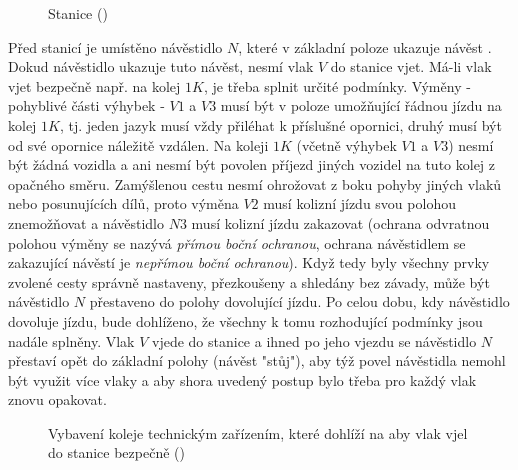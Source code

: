 {  \begin{figure}[ht!] %
    \centering
    \caption{Stanice (\cite[s.~5]{Chudacek2005})}
    \label{zzt:fig001}
  \end{figure}
 
  Před stanicí je umístěno návěstidlo \(N\), které v základní poloze ukazuje návěst . Dokud
  návěstidlo ukazuje tuto návěst, nesmí vlak \(V\) do stanice vjet. Má-li vlak vjet bezpečně např. 
  na kolej \(1K\), je třeba splnit určité podmínky. Výměny - pohyblivé části výhybek - \(V1\) a 
  \(V3\) musí být v poloze umožňující řádnou jízdu na kolej \(1K\), tj. jeden jazyk musí
  vždy přiléhat k příslušné opornici, druhý musí být od své opornice náležitě vzdálen. Na koleji 
  \(1K\) (včetně výhybek \(V1\) a \(V3\)) nesmí být žádná vozidla a ani nesmí být povolen příjezd
  jiných vozidel na tuto kolej z opačného směru. Zamýšlenou cestu nesmí ohrožovat z boku pohyby 
  jiných vlaků nebo posunujících dílů, proto výměna \(V2\) musí kolizní jízdu svou polohou 
  znemožňovat a návěstidlo \(N3\) musí kolizní jízdu zakazovat (ochrana odvratnou polohou výměny se 
  nazývá \emph{přímou boční ochranou}, ochrana návěstidlem se zakazující návěstí je \emph{nepřímou 
  boční ochranou}). Když tedy byly všechny prvky zvolené cesty správně nastaveny, přezkoušeny a 
  shledány bez závady, může být návěstidlo \(N\) přestaveno do polohy dovolující jízdu. Po celou 
  dobu, kdy návěstidlo dovoluje jízdu, bude dohlíženo, že všechny k tomu rozhodující podmínky jsou 
  nadále splněny. Vlak \(V\) vjede do stanice a ihned po jeho vjezdu se návěstidlo \(N\) přestaví 
  opět do základní polohy (návěst "stůj"), aby týž povel návěstidla nemohl být využit více vlaky a 
  aby shora uvedený postup bylo třeba pro každý vlak znovu opakovat.

  \begin{figure}[ht!] %
    \centering
    \caption{Vybavení koleje technickým zařízením, které dohlíží na aby vlak vjel do stanice 
             bezpečně
             (\cite[s.~5]{Chudacek2005})}
    \label{zzt:fig002}
  \end{figure}
  
}
